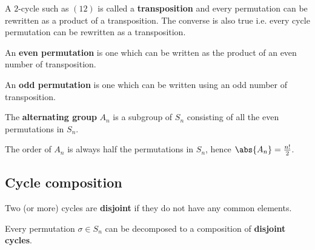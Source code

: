 \documentclass[12pt, a4paper]{article}
\begin{document}
\begin{mdremark}
    A \(2\)-cycle such as \((12)\) is called a \textbf{transposition} and every permutation can be rewritten as a product of a transposition. The converse is also true i.e. every cycle permutation can be rewritten as a transposition.
\end{mdremark}

\begin{definition}
    An \textbf{even permutation} is one which can be written as the product of an even number of transposition.
\end{definition}

\begin{definition}
    An \textbf{odd permutation} is one which can be written using an odd number of transposition.
\end{definition}

\begin{definition}
    The \textbf{alternating group} \(A_n\) is a subgroup of \(S_n\) consisting of all the even permutations in \(S_n\).
\end{definition}

\begin{theorem}
    The order of \(A_n\) is always half the permutations in \(S_n\), hence \(\abs{A_n} = \frac{n!}{2}\).
\end{theorem}

\subsection{Cycle composition}

\begin{definition}
    Two (or more) cycles are \textbf{disjoint} if they do not have any common elements.
\end{definition}

\begin{theorem}
    Every permutation \(\sigma \in S_n\) can be decomposed to a composition of \textbf{disjoint cycles}. 
\end{theorem}
\end{document}
